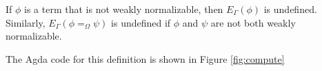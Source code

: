 If $\phi$ is a term that is not weakly normalizable, then $E_\Gamma(\phi)$ is undefined.  Similarly, $E_\Gamma(\phi =_\Omega \psi)$ is undefined if $\phi$ and $\psi$ are
not both weakly normalizable.

The Agda code for this definition is shown in Figure \ref{fig:compute}

\begin{figure}
\begin{code}%
\> \AgdaSymbol{:}  \AgdaSymbol{\{} \AgdaSymbol{\}}            \<%
\\
\>  \AgdaSymbol{(} \AgdaSymbol{\_)}  \AgdaSymbol{=}  \<%
\\
\>  \AgdaSymbol{(}  \AgdaSymbol{)}  \AgdaSymbol{=} \<[25]%
\>[25]\<%
\\
\>[0]\<[2]%
\>[2] \AgdaSymbol{\{}\AgdaSymbol{\}} \AgdaSymbol{(} \AgdaSymbol{:}  \AgdaSymbol{)} \AgdaSymbol{\{}\AgdaSymbol{\}} \AgdaSymbol{\{}\AgdaSymbol{\}}\<%
\\
\>[0]\<[2]%
\>[2]\AgdaSymbol{(} \AgdaSymbol{:}     \AgdaSymbol{)} \AgdaSymbol{(} \AgdaSymbol{:}     \AgdaSymbol{(} \AgdaSymbol{(}  \AgdaSymbol{)))}\<%
\\
\>[0]\<[2]%
\>[2]\AgdaSymbol{(} \AgdaSymbol{:}   \AgdaSymbol{(}  \AgdaSymbol{)} \AgdaSymbol{)}  \<[42]%
\>[42]\<%
\\
\>[0]\<[2]%
\>[2]  \AgdaSymbol{(}  \AgdaSymbol{)} \AgdaSymbol{(} \AgdaSymbol{(}   \AgdaSymbol{)} \AgdaSymbol{)}\<%

\end{code}
\end{figure}

